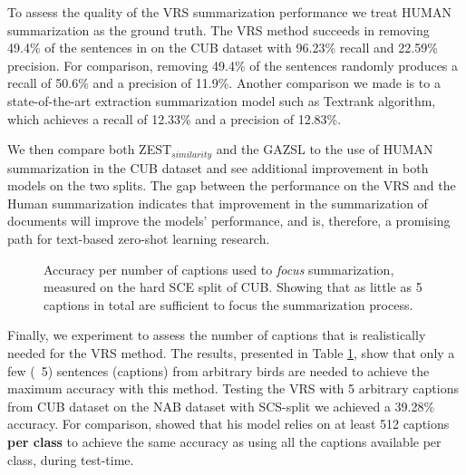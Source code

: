 \documentclass[11pt,a4paper]{article}
\newcommand\yuval[1]{\textcolor{darkpink}{\textbf{YUVAL:} #1 }}
\begin{document}
To assess the quality of the VRS summarization performance we treat HUMAN summarization as the ground truth. The VRS method succeeds in removing 49.4\% of the sentences in on the CUB dataset with 96.23\% recall and 22.59\% precision. For comparison, removing 49.4\% of the sentences randomly produces a recall of 50.6\% and a precision of 11.9\%.
Another comparison we made is to a state-of-the-art extraction summarization model such as  Textrank \citep{mihalcea2004textrank} algorithm, which achieves a recall of 12.33\% and a precision of 12.83\%.

 
We then compare both ZEST$_{similarity}$ and the GAZSL to the use of HUMAN summarization in the CUB dataset and see additional improvement in both models on the two splits. The gap between the performance on the VRS and the Human summarization indicates that improvement in the summarization of documents will improve the models' performance, and is, therefore, a promising path for text-based zero-shot learning research.


\begin{figure}[t]
\centering
{}
 \caption{Accuracy per number of captions used to \textit{focus}   summarization, measured on the hard SCE split of CUB. Showing that as little as 5 captions in total are sufficient to focus the summarization process.
 }
\label{fig:captions}
\end{figure}


Finally, we experiment to assess the  number of captions that is realistically needed for the VRS method. The results, presented in Table \ref{fig:captions}, show that only a few (~5)
 sentences (captions) from arbitrary birds are needed to achieve the maximum accuracy with this method.
Testing the VRS with 5 arbitrary captions from CUB dataset on the NAB dataset with SCS-split we achieved a 39.28\% accuracy. %
For comparison, \citet{reed2016learning} showed that his model relies on at least 512 captions \textbf{per class} to achieve the same accuracy as using all the captions available per class, during test-time.
\end{document}
